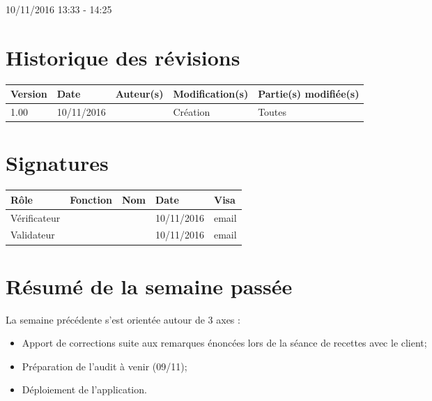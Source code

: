 \documentclass [a4paper] {article}
\begin{document}
10/11/2016			 				%
\hfill   
\hfill 	 13:33 - 14:25				%


\section*{Historique des révisions}
\begin{center}
			\begin{tabular}{| p{2.5cm} | p{3cm} | p{3cm} | p{3cm} | p{3.5cm} |}
				\hline
				\rowcolor{Gray}
				Version & Date & Auteur(s) & Modification(s) & Partie(s) modifiée(s)		 \\
				\hline
				1.00 & 10/11/2016 & \Kafui & Création & Toutes \\
				\hline			
			\end{tabular}
		\end{center}

\section*{Signatures}

		\begin{center}
			\begin{tabular}{| p{2.5cm} | p{4cm} | p{3cm} | p{3cm} | p{2.5cm} |}
				\hline
				\rowcolor{Gray}
				Rôle & Fonction & Nom & Date & Visa		 \\
				\hline
				Vérificateur & \RGC & \Melissa & 10/11/2016 & email \\[30pt]
				\hline
				Validateur & \CP & \Pierre &  10/11/2016 & email \\[30pt]	
				\hline
			\end{tabular}
		\end{center}

\section{Résumé de la semaine passée}
La semaine précédente s'est orientée autour de 3 axes :  
\begin{itemize}
	\item Apport de corrections suite aux remarques énoncées lors de la séance de recettes avec le client;
	\item Préparation de l'audit à venir (09/11);
	\item Déploiement de l'application.
\end{itemize} 
\end{document}

